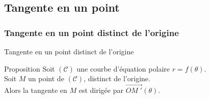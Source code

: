 \documentclass[14pt]{beamer}
\begin{document}
\subsection{Tangente en un point}
\subsubsection{Tangente en un point distinct de l'origine}
\begin{frame}{Tangente en un point distinct de l'origine}
        \begin{alertblock}{Proposition}
                Soit $(\mathcal{C})$ une courbe d'équation polaire $r=f(\theta)$.\\
                Soit $M$ un point de $(\mathcal{C})$, distinct de l'origine.\\
                Alors la tangente en $M$ est dirigée par $\vec{OM\;'}(\theta)$.
        \end{alertblock}
\end{frame}
\end{document}
